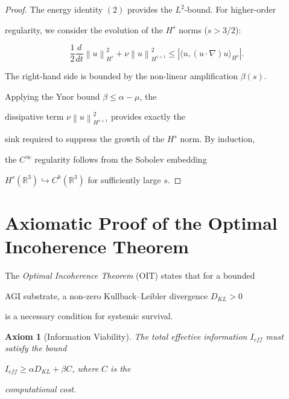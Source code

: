 \documentclass[11pt,a4paper]{amsart}
\newtheorem{axiom}[theorem]{Axiom}
\newcommand{\alphacoeff}{\ensuremath{\alpha}}
\newcommand{\betacoeff}{\ensuremath{\beta}}
\newcommand{\mumargin}{\ensuremath{\mu}}
\newcommand{\norm}[1]{\left\|#1\right\|}
\newcommand{\inner}[2]{\langle #1, #2 \rangle}
\begin{document}
\begin{proof}

The energy identity $(2)$ provides the $L^2$-bound. For higher-order 

regularity, we consider the evolution of the $H^s$ norms ($s > 3/2$):

\begin{equation}

    \frac{1}{2} \frac{d}{dt} \norm{u}_{H^s}^2 + \nu \norm{u}_{H^{s+1}}^2 

    \le \left| \inner{u}{(u \cdot \nabla)u}_{H^s} \right|.

\end{equation}

The right-hand side is bounded by the non-linear amplification $\betacoeff(s)$. 

Applying the Ynor bound $\betacoeff \le \alphacoeff - \mumargin$, the 

dissipative term $\nu \norm{u}_{H^{s+1}}^2$ provides exactly the 

sink required to suppress the growth of the $H^s$ norm. By induction, 

the $C^{\infty}$ regularity follows from the Sobolev embedding 

$H^s(\mathbb{R}^3) \hookrightarrow C^k(\mathbb{R}^3)$ for sufficiently large $s$.

\end{proof}




\section{Axiomatic Proof of the Optimal Incoherence Theorem}

The \emph{Optimal Incoherence Theorem} (OIT) states that for a bounded 

AGI substrate, a non-zero Kullback--Leibler divergence $D_{KL} > 0$ 

is a necessary condition for systemic survival.



\begin{axiom}[Information Viability]

The total effective information $I_{eff}$ must satisfy the bound 

$I_{eff} \ge \alphacoeff D_{KL} + \betacoeff C$, where $C$ is the 

computational cost.

\end{axiom}
\end{document}

